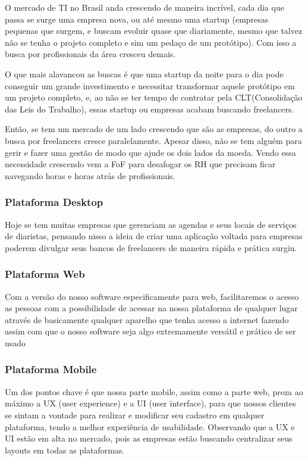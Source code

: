 O mercado de TI no Brasil anda crescendo de maneira incrível, cada dia que passa se surge
uma empresa nova, ou até mesmo uma startup (empresas pequenas que surgem, e buscam
evoluir quase que diariamente, mesmo que talvez não se tenha o projeto completo e sim um
pedaço de um protótipo). Com isso a busca por profissionais da área cresceu demais.

O que mais alavancou as buscas é que uma startup da noite para o dia pode conseguir um
grande investimento e necessitar transformar aquele protótipo em um projeto completo, e, ao
não se ter tempo de contratar pela CLT(Consolidação das Leis do Trabalho), essas startup ou
empresas acabam buscando freelancers.

Então, se tem um mercado de um lado crescendo que são as empresas, do outro a busca por
freelancers cresce paralelamente. Apesar disso, não se tem alguém para gerir e fazer uma
gestão de modo que ajude os dois lados da moeda. Vendo essa necessidade crescendo vem a
FoF para desafogar os RH que precisam ficar navegando horas e horas atrás de profissionais.

\subsubsection{Plataforma Desktop}

Hoje se tem muitas empresas que gerenciam as agendas e seus locais de
serviços de diaristas, pensando nisso a ideia de criar uma aplicação voltada para
empresas poderem divulgar seus bancos de freelancers de maneira rápida e prática
surgiu.

\subsubsection{Plataforma Web}

Com a versão do nosso software especificamente para web, facilitaremos o
acesso as pessoas com a possibilidade de acessar na nossa plataforma de qualquer
lugar através de basicamente qualquer aparelho que tenha acesso a internet fazendo
assim com que o nosso software seja algo extremamente versátil e prático de ser
usado

\subsubsection{Plataforma Mobile}

Um dos pontos chave é que nossa parte mobile, assim como a parte web, preza
ao máximo a UX (user experience) e a UI (user interface), para que nossos clientes
se sintam a vontade para realizar e modificar seu cadastro em qualquer plataforma,
tendo a melhor experiência de usabilidade. Observando que a UX e UI estão em alta
no mercado, pois as empresas estão buscando centralizar seus layouts em todas as
plataformas.
\newpage

